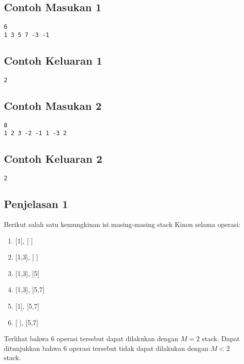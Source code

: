 \documentclass{article}
\begin{document}
\begin{multicols}{2}
\subsection*{Contoh Masukan 1}
\begin{lstlisting}
6
1 3 5 7 -3 -1
\end{lstlisting}
\columnbreak
\subsection*{Contoh Keluaran 1}
\begin{lstlisting}
2
\end{lstlisting}
\vfill
\null
\end{multicols}

\begin{multicols}{2}
\subsection*{Contoh Masukan 2}
\begin{lstlisting}
8
1 2 3 -2 -1 1 -3 2
\end{lstlisting}
\columnbreak
\subsection*{Contoh Keluaran 2}
\begin{lstlisting}
2
\end{lstlisting}
\vfill
\null
\end{multicols}


\subsection*{Penjelasan 1}
Berikut salah satu kemungkinan isi masing-masing stack Kinon selama operasi:

\begin{enumerate}

\item{[1], [ ]}
\item{[1,3], [ ]}
\item{[1,3], [5]}
\item{[1,3], [5,7]}
\item{[1], [5,7]}
\item{[ ], [5,7]}

\end{enumerate}

Terlihat bahwa 6 operasi tersebut dapat dilakukan dengan $M=2$ stack. Dapat ditunjukkan bahwa 6 operasi tersebut tidak dapat dilakukan dengan $M<2$ stack. 
\end{document}
